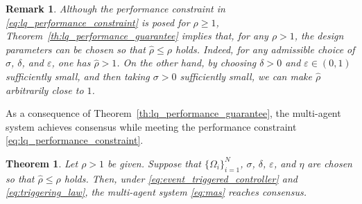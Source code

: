 \documentclass[letterpaper,10pt,conference]{ieeeconf}
\newtheorem{theorem}{Theorem}
\newtheorem{remark}{Remark}
\begin{document}
\begin{remark}
  Although the performance constraint in \eqref{eq:lq_performance_constraint} is posed for $\rho \geq 1$, Theorem~\ref{th:lq_performance_guarantee} implies that, for any $\rho > 1$, the design parameters can be chosen so that $\hat\rho \leq \rho$ holds.
  Indeed, for any admissible choice of $\sigma$, $\delta$, and $\varepsilon$, one has $\hat\rho > 1$.
  On the other hand, by choosing $\delta > 0$ and $\varepsilon \in (0,1)$ sufficiently small, and then taking $\sigma > 0$ sufficiently small, we can make $\hat\rho$ arbitrarily close to $1$.
\end{remark}

As a consequence of Theorem~\ref{th:lq_performance_guarantee}, the multi-agent system achieves consensus while meeting the performance constraint \eqref{eq:lq_performance_constraint}.

\begin{theorem} \label{th:consensus}
  Let $\rho > 1$ be given.
  Suppose that $\{\Omega_i\}_{i=1}^N$, $\sigma$, $\delta$, $\varepsilon$, and $\eta$
  are chosen so that $\hat\rho \leq \rho$ holds.
  Then, under \eqref{eq:event_triggered_controller} and \eqref{eq:triggering_law}, the multi-agent system \eqref{eq:mas} reaches consensus.
\end{theorem}
\end{document}
